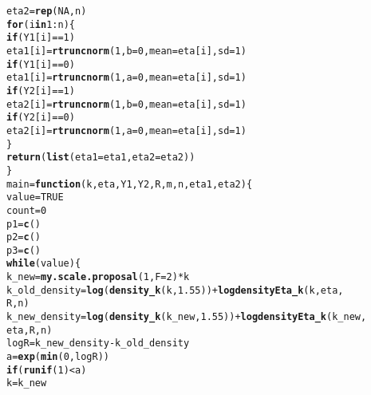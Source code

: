 \documentclass[12pt]{article}\usepackage[]{graphicx}\usepackage[]{color}
\makeatletter
\newcommand{\hlnum}[1]{\textcolor[rgb]{0.686,0.059,0.569}{#1}}%
\newcommand{\hlopt}[1]{\textcolor[rgb]{0,0,0}{#1}}%
\newcommand{\hlstd}[1]{\textcolor[rgb]{0.345,0.345,0.345}{#1}}%
\newcommand{\hlkwa}[1]{\textcolor[rgb]{0.161,0.373,0.58}{\textbf{#1}}}%
\newcommand{\hlkwb}[1]{\textcolor[rgb]{0.69,0.353,0.396}{#1}}%
\newcommand{\hlkwc}[1]{\textcolor[rgb]{0.333,0.667,0.333}{#1}}%
\newcommand{\hlkwd}[1]{\textcolor[rgb]{0.737,0.353,0.396}{\textbf{#1}}}%
\newenvironment{kframe}{%
 \def\at@end@of@kframe{}%
 \ifinner\ifhmode%
  \def\at@end@of@kframe{\end{minipage}}%
  \begin{minipage}{\columnwidth}%
 \fi\fi%
 \def\FrameCommand##1{\hskip\@totalleftmargin \hskip-\fboxsep
 \colorbox{shadecolor}{##1}\hskip-\fboxsep
     \hskip-\linewidth \hskip-\@totalleftmargin \hskip\columnwidth}%
 \MakeFramed {\advance\hsize-\width
   \@totalleftmargin\z@ \linewidth\hsize
   \@setminipage}}%
 {\par\unskip\endMakeFramed%
 \at@end@of@kframe}
\newenvironment{knitrout}{}{} %
\makeatother
\begin{document}
\begin{knitrout}
\begin{kframe}
\begin{alltt}
    \hlstd{eta2} \hlkwb{=} \hlkwd{rep}\hlstd{(}\hlnum{NA}\hlstd{, n)}
    \hlkwa{for} \hlstd{(i} \hlkwa{in} \hlnum{1}\hlopt{:}\hlstd{n) \{}
        \hlkwa{if} \hlstd{(Y1[i]} \hlopt{==} \hlnum{1}\hlstd{)}
            \hlstd{eta1[i]} \hlkwb{=} \hlkwd{rtruncnorm}\hlstd{(}\hlnum{1}\hlstd{,} \hlkwc{b} \hlstd{=} \hlnum{0}\hlstd{,} \hlkwc{mean} \hlstd{= eta[i],} \hlkwc{sd} \hlstd{=} \hlnum{1}\hlstd{)}
        \hlkwa{if} \hlstd{(Y1[i]} \hlopt{==} \hlnum{0}\hlstd{)}
            \hlstd{eta1[i]} \hlkwb{=} \hlkwd{rtruncnorm}\hlstd{(}\hlnum{1}\hlstd{,} \hlkwc{a} \hlstd{=} \hlnum{0}\hlstd{,} \hlkwc{mean} \hlstd{= eta[i],} \hlkwc{sd} \hlstd{=} \hlnum{1}\hlstd{)}
        \hlkwa{if} \hlstd{(Y2[i]} \hlopt{==} \hlnum{1}\hlstd{)}
            \hlstd{eta2[i]} \hlkwb{=} \hlkwd{rtruncnorm}\hlstd{(}\hlnum{1}\hlstd{,} \hlkwc{b} \hlstd{=} \hlnum{0}\hlstd{,} \hlkwc{mean} \hlstd{= eta[i],} \hlkwc{sd} \hlstd{=} \hlnum{1}\hlstd{)}
        \hlkwa{if} \hlstd{(Y2[i]} \hlopt{==} \hlnum{0}\hlstd{)}
            \hlstd{eta2[i]} \hlkwb{=} \hlkwd{rtruncnorm}\hlstd{(}\hlnum{1}\hlstd{,} \hlkwc{a} \hlstd{=} \hlnum{0}\hlstd{,} \hlkwc{mean} \hlstd{= eta[i],} \hlkwc{sd} \hlstd{=} \hlnum{1}\hlstd{)}
    \hlstd{\}}
    \hlkwd{return}\hlstd{(}\hlkwd{list}\hlstd{(}\hlkwc{eta1} \hlstd{= eta1,} \hlkwc{eta2} \hlstd{= eta2))}
\hlstd{\}}
\hlstd{main} \hlkwb{=} \hlkwa{function}\hlstd{(}\hlkwc{k}\hlstd{,} \hlkwc{eta}\hlstd{,} \hlkwc{Y1}\hlstd{,} \hlkwc{Y2}\hlstd{,} \hlkwc{R}\hlstd{,} \hlkwc{m}\hlstd{,} \hlkwc{n}\hlstd{,} \hlkwc{eta1}\hlstd{,} \hlkwc{eta2}\hlstd{) \{}
    \hlstd{value} \hlkwb{=} \hlnum{TRUE}
    \hlstd{count} \hlkwb{=} \hlnum{0}
    \hlstd{p1} \hlkwb{=} \hlkwd{c}\hlstd{()}
    \hlstd{p2} \hlkwb{=} \hlkwd{c}\hlstd{()}
    \hlstd{p3} \hlkwb{=} \hlkwd{c}\hlstd{()}
    \hlkwa{while} \hlstd{(value) \{}
        \hlstd{k_new} \hlkwb{=} \hlkwd{my.scale.proposal}\hlstd{(}\hlnum{1}\hlstd{,} \hlkwc{F} \hlstd{=} \hlnum{2}\hlstd{)} \hlopt{*} \hlstd{k}
        \hlstd{k_old_density} \hlkwb{=} \hlkwd{log}\hlstd{(}\hlkwd{density_k}\hlstd{(k,} \hlnum{1.55}\hlstd{))} \hlopt{+} \hlkwd{logdensityEta_k}\hlstd{(k, eta,}
            \hlstd{R, n)}
        \hlstd{k_new_density} \hlkwb{=} \hlkwd{log}\hlstd{(}\hlkwd{density_k}\hlstd{(k_new,} \hlnum{1.55}\hlstd{))} \hlopt{+} \hlkwd{logdensityEta_k}\hlstd{(k_new,}
            \hlstd{eta, R, n)}
        \hlstd{logR} \hlkwb{=} \hlstd{k_new_density} \hlopt{-} \hlstd{k_old_density}
        \hlstd{a} \hlkwb{=} \hlkwd{exp}\hlstd{(}\hlkwd{min}\hlstd{(}\hlnum{0}\hlstd{, logR))}
        \hlkwa{if} \hlstd{(}\hlkwd{runif}\hlstd{(}\hlnum{1}\hlstd{)} \hlopt{<} \hlstd{a)}
            \hlstd{k} \hlkwb{=} \hlstd{k_new}

\end{alltt}
\end{kframe}
\end{knitrout}
\end{document}
